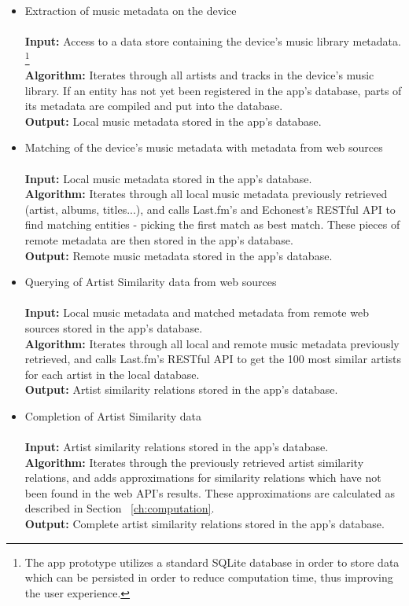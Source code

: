 \begin{itemize}
	\item Extraction of music metadata on the device \\\\
			\textbf{Input:} Access to a data store containing the device's music library metadata. \footnote{The app prototype utilizes a standard SQLite database in order to store data which can be persisted in order to reduce computation time, thus improving the user experience.}
			  \\
			\textbf{Algorithm:} Iterates through all artists and tracks in the device's music library.
			If an entity has not yet been registered in the app's database, parts of its metadata are 
			compiled and put into the database. \\
			\textbf{Output:} Local music metadata stored in the app's database.\\
			
	\item Matching of the device's music metadata with metadata from web sources \\\\
			\textbf{Input:} Local music metadata stored in the app's database.  \\
			\textbf{Algorithm:} Iterates through all local music metadata previously retrieved (artist, albums, titles...), and calls
			Last.fm's and Echonest's RESTful API to find matching entities - picking the first match as best match. These pieces
			of remote metadata are then stored in the app's database. \\
			\textbf{Output:} Remote music metadata stored in the app's database. \\
			
	\item Querying of Artist Similarity data from web sources \\\\
			\textbf{Input:} Local music metadata and matched metadata from remote web sources stored in the app's database. \\
			\textbf{Algorithm:} Iterates through all local and remote music metadata previously retrieved, and calls
			Last.fm's RESTful API to get the 100 most similar artists for each artist in the local database. \\
			\textbf{Output:} Artist similarity relations stored in the app's database. \\
			
	\item Completion of Artist Similarity data \\\\
			\textbf{Input:} Artist similarity relations stored in the app's database. \\
			\textbf{Algorithm:} Iterates through the previously retrieved artist similarity relations, and
			adds approximations for similarity relations which have not been found in the web API's results.
			These approximations are calculated as described in Section ~\ref{ch:computation}. \\
			\textbf{Output:} Complete artist similarity relations stored in the app's database. \\
			

\end{itemize}
